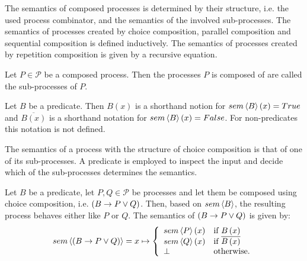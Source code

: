 The semantics of composed processes is determined by their structure, i.e. the used process combinator, and the semantics of the involved sub-processes. The semantics of processes created by choice composition, parallel composition and sequential composition is defined inductively. The semantics of processes created by repetition composition is given by a recursive equation.

\begin{definition}
Let $P \in \mathcal{P}$ be a composed process. Then the processes $P$ is composed of are called the sub-processes of $P$.

\hfill\qedsymbol
\end{definition}

\begin{definition}
Let $B$ be a predicate. Then $B \left( x \right)$ is a shorthand notion for $sem \left\langle B \right\rangle \left( x \right) = True$ and $\overline{B \left( x \right)}$ is a shorthand notation for $sem \left\langle B \right\rangle \left( x \right) = False$. For non-predicates this notation is not defined.

\hfill\qedsymbol
\end{definition}


The semantics of a process with the structure of choice composition is that of one of its sub-processes. A predicate is employed to inspect the input and decide which of the sub-processes determines the semantics.
\begin{definition}
\label{def:sem_choice}
Let $B$ be a predicate, let $P, Q \in \mathcal{P}$ be processes and let them be composed using choice composition, i.e. $\left( B \to P \vee Q \right)$. Then, based on $sem \left\langle B \right\rangle$, the resulting process behaves either like $P$ or $Q$. The semantics of $\left( B \to P \vee Q \right)$ is given by:
  \begin{equation*}
    \label{eqn:sem_choice}
    sem \left\langle \left( B \to P \vee Q \right) \right\rangle = x \mapsto \left\{ \begin{array}{ll}
      sem \left\langle P \right\rangle\left(x\right) & \text{if } B \left( x \right) \\
      sem \left\langle Q \right\rangle\left(x\right) & \text{if } \overline{B \left( x \right)} \\
      \bot & \text{otherwise}.
    \end{array}\right.
  \end{equation*}
  
  \hfill\qedsymbol
\end{definition}

